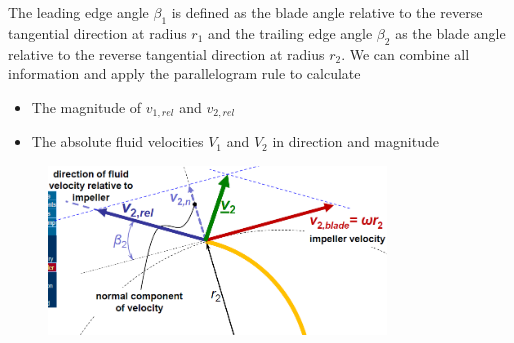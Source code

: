 \documentclass[class=report, crop=false, 12pt,a4paper]{standalone}
\begin{document}
The leading edge angle $\beta_1$ is defined as the blade angle relative to the reverse tangential direction at radius $r_1$ and the trailing edge angle $\beta_2$ as the blade angle relative to the reverse tangential direction at radius $r_2$. We can combine all information and apply the parallelogram rule to calculate
\begin{itemize}
  \item The magnitude of $v_{1, rel}$ and $v_{2, rel}$
  \item The absolute fluid velocities $V_1$ and $V_2$ in direction and magnitude
\end{itemize}
\begin{figure}[H]
  \centering
  \includegraphics[width = 0.8\textwidth]{../img/diagram8.png}
\end{figure}
\end{document}
